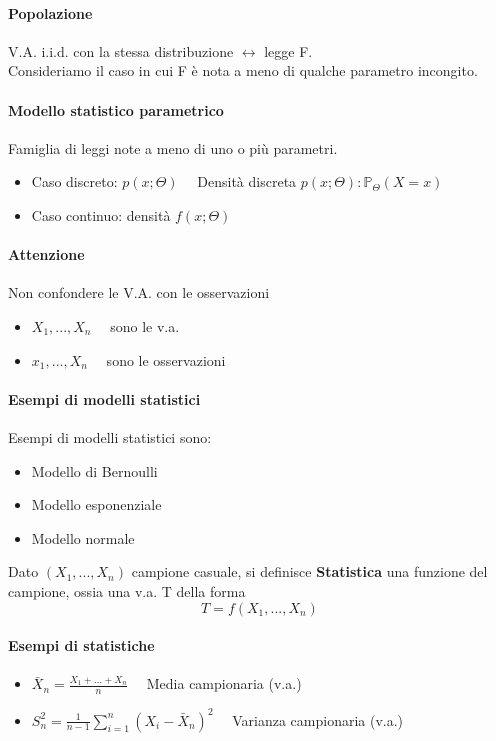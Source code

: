 \documentclass[12pt, a4paper, openany]{book}
\begin{document}
\paragraph*{Popolazione} V.A. i.i.d. con la stessa distribuzione $\leftrightarrow$
legge F.
\\ Consideriamo il caso in cui F è nota a meno di qualche parametro incongito.
\paragraph*{Modello statistico parametrico} Famiglia di leggi note a meno di uno o
più parametri.
\begin{itemize}
    \item Caso discreto: $p(x; \Theta) \quad$ 
    Densità discreta $p(x;\Theta):\mathbb{P}_\Theta (X=x)$
    \item Caso continuo: densità $f(x; \Theta)$
\end{itemize}
\paragraph*{Attenzione} Non confondere le V.A. con le osservazioni
\begin{itemize}
    \item $X_1, ..., X_n \quad$ sono le v.a.
    \item $x_1, ..., X_n \quad$ sono le osservazioni
\end{itemize}
\paragraph*{Esempi di modelli statistici}
Esempi di modelli statistici sono:
\begin{itemize}
    \item Modello di Bernoulli
    \item Modello esponenziale
    \item Modello normale
\end{itemize}
Dato $(X_1, ..., X_n)$ campione casuale, si definisce \textbf{Statistica} una
funzione del campione, ossia una v.a. T della forma
\begin{equation*}
    T=f(X_1, ..., X_n)
\end{equation*}
\paragraph*{Esempi di statistiche}
\begin{itemize}
    \item $\bar{X}_n = \frac{X_1+...+X_n}{n} \quad$ Media campionaria (v.a.)
    \item $S^{2}_n = \frac{1}{n-1} \sum_{i=1}^n(X_i - \bar{X}_n)^2 \quad$ Varianza campionaria (v.a.)
\end{itemize}
\end{document}
